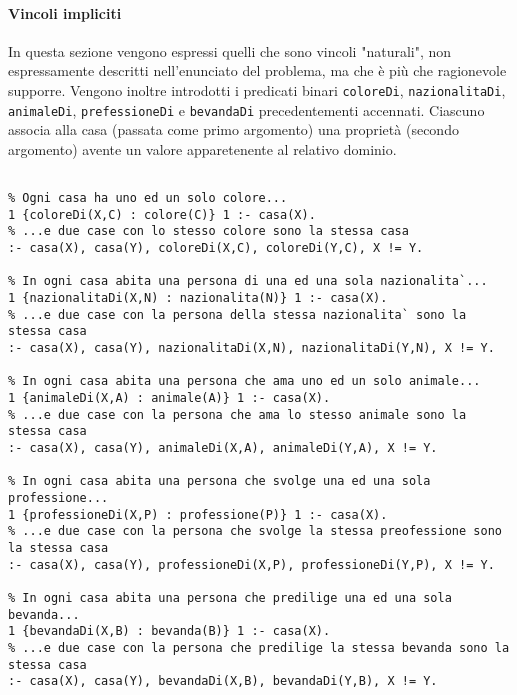 \paragraph{Vincoli impliciti}
In questa sezione vengono espressi quelli che sono vincoli "naturali", non espressamente descritti nell'enunciato del problema, ma che è più che ragionevole supporre. Vengono inoltre introdotti i predicati binari \texttt{coloreDi}, \texttt{nazionalitaDi}, \texttt{animaleDi}, \texttt{prefessioneDi} e \texttt{bevandaDi} precedentementi accennati. Ciascuno associa alla casa (passata come primo argomento) una proprietà (secondo argomento) avente un valore apparetenente al relativo dominio.
\begin{lstlisting}[frame=tb]
%% Vincoli impliciti

% Ogni casa ha uno ed un solo colore...
1 {coloreDi(X,C) : colore(C)} 1 :- casa(X).
% ...e due case con lo stesso colore sono la stessa casa
:- casa(X), casa(Y), coloreDi(X,C), coloreDi(Y,C), X != Y.

% In ogni casa abita una persona di una ed una sola nazionalita`...
1 {nazionalitaDi(X,N) : nazionalita(N)} 1 :- casa(X).
% ...e due case con la persona della stessa nazionalita` sono la stessa casa
:- casa(X), casa(Y), nazionalitaDi(X,N), nazionalitaDi(Y,N), X != Y.

% In ogni casa abita una persona che ama uno ed un solo animale...
1 {animaleDi(X,A) : animale(A)} 1 :- casa(X).
% ...e due case con la persona che ama lo stesso animale sono la stessa casa
:- casa(X), casa(Y), animaleDi(X,A), animaleDi(Y,A), X != Y.

% In ogni casa abita una persona che svolge una ed una sola professione...
1 {professioneDi(X,P) : professione(P)} 1 :- casa(X).
% ...e due case con la persona che svolge la stessa preofessione sono la stessa casa
:- casa(X), casa(Y), professioneDi(X,P), professioneDi(Y,P), X != Y.

% In ogni casa abita una persona che predilige una ed una sola bevanda...
1 {bevandaDi(X,B) : bevanda(B)} 1 :- casa(X).
% ...e due case con la persona che predilige la stessa bevanda sono la stessa casa
:- casa(X), casa(Y), bevandaDi(X,B), bevandaDi(Y,B), X != Y.
\end{lstlisting}
